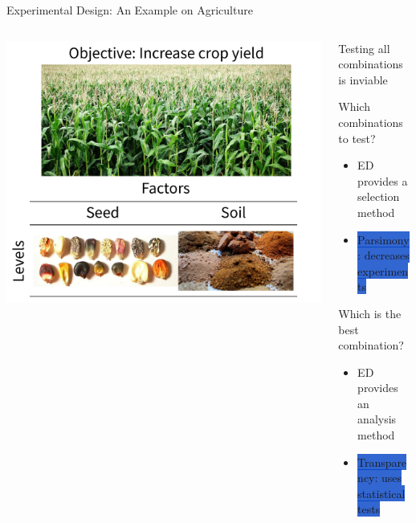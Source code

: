 \documentclass[10pt, compress, aspectratio=169, xcolor={table,usenames,dvipsnames}]{beamer}
\begin{document}
\begin{frame}[label={sec:org1dfd231}]{Experimental Design: An Example on Agriculture}
\begin{columns}
\begin{column}{0.55\columnwidth}
\begin{center}
\includegraphics[width=.99\columnwidth]{../../../img/crop_yield_doe_example.pdf}
\end{center}
\end{column}
\begin{column}{0.45\columnwidth}
\begin{block}{Testing all combinations is \alert{inviable}}
\begin{block}{Which combinations to test?}
\begin{itemize}
\item ED provides a selection method
\item \colorbox{Highlight}{\alert{Parsimony}: decreases experiments}
\end{itemize}
\end{block}

\begin{block}{Which is the best combination?}
\begin{itemize}
\item ED provides an analysis method
\item \colorbox{Highlight}{\alert{Transparency}: uses statistical tests}
\end{itemize}
\end{block}
\end{block}
\end{column}
\end{columns}
\end{frame}
\end{document}
